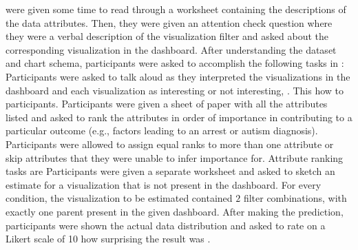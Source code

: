 were given some time to read through a worksheet
containing the descriptions of the data attributes.
Then, they were given an attention check question
where they were
a verbal description of the visualization filter
and asked about the corresponding visualization in the dashboard.
After understanding the dataset and chart schema,
participants were asked to accomplish the following
tasks in :
Participants were asked to talk aloud
as they interpreted the visualizations
in the dashboard and 
each visualization as interesting or
not interesting, .
This 
how 
to participants. %
Participants were given a sheet of paper
with all the attributes listed
and asked to rank the attributes
in order of importance in contributing
to a particular outcome
(e.g., factors leading to an arrest or autism diagnosis).
Participants were allowed to assign equal ranks to more than one attribute or skip attributes that they were unable to infer importance for.
Attribute ranking tasks are %
Participants were given a separate worksheet
and asked to sketch an estimate for a visualization
that is not present in the dashboard.
For every condition, the visualization to be estimated
contained $2$ filter combinations,
with exactly one parent present in the given dashboard.
After making the prediction,
participants were shown the actual data
distribution and asked to rate on a Likert scale
of 10 how surprising the result was
.
